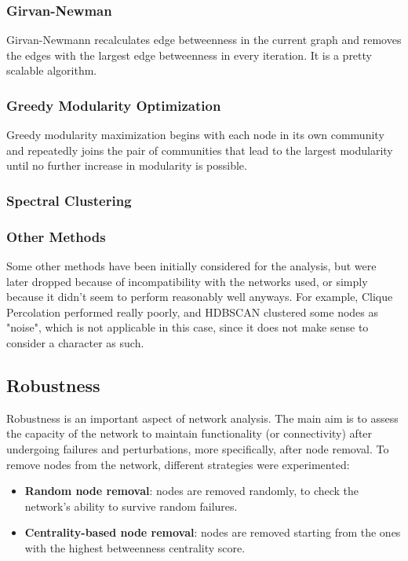 \documentclass[10pt,twocolumn,letterpaper]{article}
\begin{document}
\subsubsection{Girvan-Newman}

Girvan-Newmann recalculates edge betweenness in the current graph and removes the edges with the largest edge betweenness in every iteration. It is a pretty scalable algorithm.


\subsubsection{Greedy Modularity Optimization}

Greedy modularity maximization begins with each node in its own community and repeatedly joins the pair of communities that lead to the largest modularity until no further increase in modularity is possible.

\subsubsection{Spectral Clustering}


\subsubsection{Other Methods}

Some other methods have been initially considered for the analysis, but were later dropped because of incompatibility with the networks used, or simply because it didn't seem to perform reasonably well anyways. For example, Clique Percolation performed really poorly, and HDBSCAN clustered some nodes as "noise", which is not applicable in this case, since it does not make sense to consider a character as such.


\subsection{Robustness}

Robustness is an important aspect of network analysis. The main aim is to assess the
capacity of the network to maintain functionality (or connectivity) after undergoing failures
and perturbations, more specifically, after node removal. To remove nodes from the network, different strategies were experimented:
\begin{itemize}
    \item \textbf{Random node removal}: nodes are removed randomly, to check the network’s ability to survive random failures.
    \item \textbf{Centrality-based node removal}: nodes are removed starting from the ones with the highest betweenness centrality score.
\end{itemize}
\end{document}
